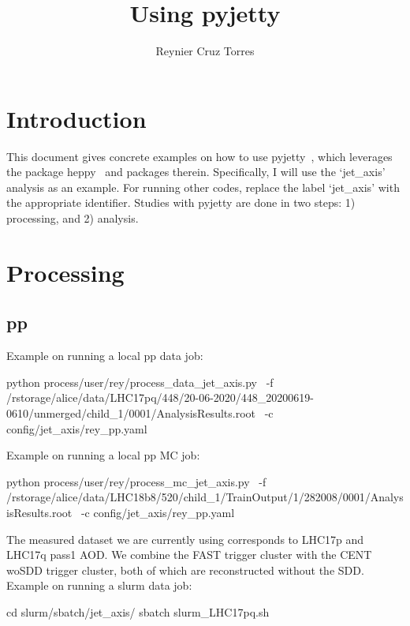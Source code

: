 \documentclass[12pt]{article}
\title{Using pyjetty}
\author{Reynier Cruz Torres}
\begin{document}
\maketitle

\tableofcontents

\newpage
\section{Introduction}
This document gives concrete examples on how to use pyjetty~\cite{pyjetty}, which
leverages the package heppy~\cite{heppy} and packages therein.
Specifically, I will use the `jet\_axis' analysis as an example. For running other codes,
replace the label `jet\_axis' with the appropriate identifier.
Studies with pyjetty are done in two steps: 1) processing, and 2) analysis.

\section{Processing}

\subsection{pp}
Example on running a local pp data job:

\begin{tcolorbox}
\begin{verbnobox}[\scriptsize]
python process/user/rey/process_data_jet_axis.py \
-f /rstorage/alice/data/LHC17pq/448/20-06-2020/448_20200619-0610/unmerged/child_1/0001/AnalysisResults.root \
-c config/jet_axis/rey_pp.yaml
\end{verbnobox}  
\end{tcolorbox}

Example on running a local pp MC job:
\begin{tcolorbox}
\begin{verbnobox}[\scriptsize]
python process/user/rey/process_mc_jet_axis.py \
-f /rstorage/alice/data/LHC18b8/520/child_1/TrainOutput/1/282008/0001/AnalysisResults.root \
-c config/jet_axis/rey_pp.yaml
\end{verbnobox}  
\end{tcolorbox}

The measured dataset we are currently using corresponds to LHC17p and LHC17q pass1 AOD. We combine the FAST
trigger cluster with the CENT woSDD trigger cluster, both of which are reconstructed without the SDD.
Example on running a slurm data job:
\begin{tcolorbox}
\begin{verbnobox}[\scriptsize]
cd slurm/sbatch/jet_axis/
sbatch slurm_LHC17pq.sh
\end{verbnobox}  
\end{tcolorbox}
\end{document}
